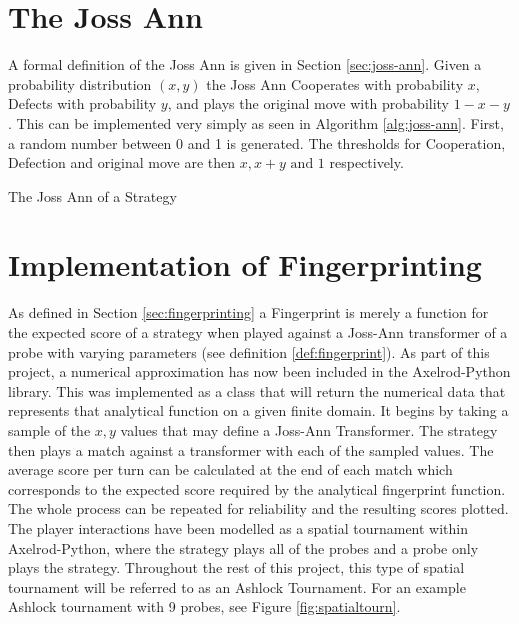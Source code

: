 \section{The Joss Ann}

A formal definition of the Joss Ann is given in Section \ref{sec:joss-ann}.
Given a probability distribution $(x, y)$ the Joss Ann Cooperates with probability $x$, Defects with probability $y$, and plays the original move with probability $1 -x-y$.
This can be implemented very simply as seen in Algorithm \ref{alg:joss-ann}.
First, a random number between 0 and 1 is generated.
The thresholds for Cooperation, Defection and original move are then $x, x+y \text{ and } 1$ respectively.

\begin{algorithm}[H]
 \caption{The Joss Ann of a Strategy}
 \label{alg:joss-ann}
\end{algorithm}

\section{Implementation of Fingerprinting}\label{sec:fingerprint-implementation}

As defined in Section \ref{sec:fingerprinting} a Fingerprint is merely a function for the expected score of a strategy when played against a Joss-Ann transformer of a probe with varying parameters (see definition \ref{def:fingerprint}).
As part of this project, a numerical approximation has now been included in the Axelrod-Python library.
This was implemented as a class that will return the numerical data that represents that analytical function on a given finite domain.
It begins by taking a sample of the $x,y$ values that may define a Joss-Ann Transformer.
The strategy then plays a match against a transformer with each of the sampled values.
The average score per turn can be calculated at the end of each match which corresponds to the expected score required by the analytical fingerprint function.
The whole process can be repeated for reliability and the resulting scores plotted.
The player interactions have been modelled as a spatial tournament within Axelrod-Python, where the strategy plays all of the probes and a probe only plays the strategy.
Throughout the rest of this project, this type of spatial tournament will be referred to as an Ashlock Tournament.
For an example Ashlock tournament with 9 probes, see Figure \ref{fig:spatialtourn}.

